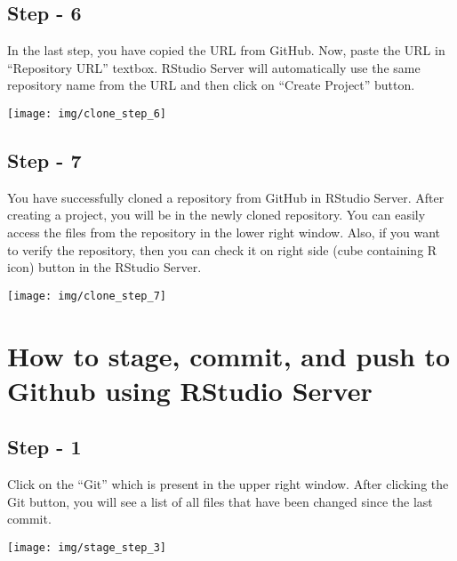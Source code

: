 \documentclass[
]{book}
\begin{document}
\hypertarget{step---6}{%
\subsection{Step - 6}\label{step---6}}

In the last step, you have copied the URL from GitHub. Now, paste the URL in ``Repository URL'' textbox. RStudio Server will automatically use the same repository name from the URL and then click on ``Create Project'' button.

\begin{center}\texttt{[image: img/clone\_step\_6]} \end{center}

\hypertarget{step---7}{%
\subsection{Step - 7}\label{step---7}}

You have successfully cloned a repository from GitHub in RStudio Server. After creating a project, you will be in the newly cloned repository. You can easily access the files from the repository in the lower right window. Also, if you want to verify the repository, then you can check it on right side (cube containing R icon) button in the RStudio Server.

\begin{center}\texttt{[image: img/clone\_step\_7]} \end{center}

\hypertarget{how-to-stage-commit-and-push-to-github-using-rstudio-server}{%
\section{How to stage, commit, and push to Github using RStudio Server}\label{how-to-stage-commit-and-push-to-github-using-rstudio-server}}

\hypertarget{step---1-1}{%
\subsection{Step - 1}\label{step---1-1}}

Click on the ``Git'' which is present in the upper right window. After clicking the Git button, you will see a list of all files that have been changed since the last commit.

\begin{center}\texttt{[image: img/stage\_step\_3]} \end{center}
\end{document}
